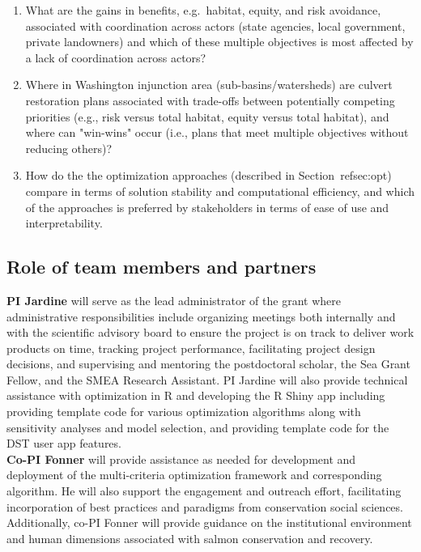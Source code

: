 \documentclass[12pt]{elsarticle}
\begin{document}
\begin{enumerate}
\item What are the gains in benefits, e.g.\ habitat, equity, and risk avoidance, associated with coordination across actors (state agencies, local government, private landowners) and which of these multiple objectives is most affected by a lack of coordination across actors? 
\item Where in Washington injunction area (sub-basins/watersheds) are culvert restoration plans associated with trade-offs between potentially competing priorities (e.g., risk versus total habitat, equity versus total habitat), and where can "win-wins" occur (i.e., plans that meet multiple objectives without reducing others)? 
\item How do the the optimization approaches (described in Section~ref{sec:opt}) compare in terms of solution stability and computational efficiency, and which of the approaches is preferred by stakeholders in terms of ease of use and interpretability. 
\end{enumerate}


\subsection*{Role of team members and partners}
\textbf{PI Jardine} will serve as the lead administrator of the grant where administrative responsibilities include organizing meetings both internally and with the scientific advisory board to ensure the project is on track to deliver work products on time, tracking project performance, facilitating project design decisions, and supervising and mentoring the postdoctoral scholar, the Sea Grant Fellow, and the SMEA Research Assistant.  PI Jardine will also provide technical assistance with optimization in R and developing the R Shiny app including providing template code for various optimization algorithms along with sensitivity analyses and model selection, and providing template code for the DST user app features.\\


\textbf{Co-PI Fonner} will provide assistance as needed for development and deployment of the multi-criteria optimization framework and corresponding algorithm. He will also support the engagement and outreach effort, facilitating incorporation of best practices and paradigms from conservation social sciences. Additionally, co-PI Fonner will provide guidance on the institutional environment and human dimensions associated with salmon conservation and recovery.\\
\end{document}
